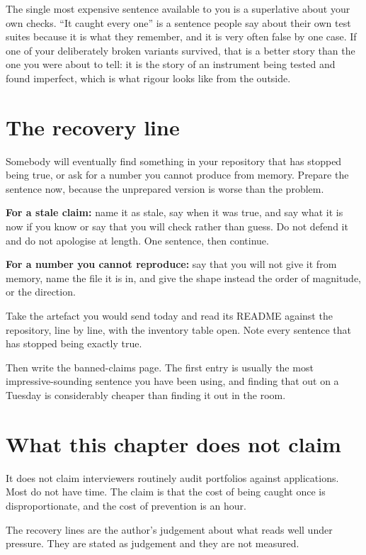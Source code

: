 \begin{kittrap}
The single most expensive sentence available to you is a superlative about your
own checks. ``It caught every one'' is a sentence people say about their own
test suites because it is what they remember, and it is very often false by one
case. If one of your deliberately broken variants survived, that is a better
story than the one you were about to tell: it is the story of an instrument
being tested and found imperfect, which is what rigour looks like from the
outside.
\end{kittrap}

\section{The recovery line}

Somebody will eventually find something in your repository that has stopped
being true, or ask for a number you cannot produce from memory. Prepare the
sentence now, because the unprepared version is worse than the problem.

\begin{kitmethod}
\textbf{For a stale claim:} name it as stale, say when it was true, and say what
it is now if you know \dash{} or say that you will check rather than guess. Do
not defend it and do not apologise at length. One sentence, then continue.

\textbf{For a number you cannot reproduce:} say that you will not give it from
memory, name the file it is in, and give the shape instead \dash{} the order of
magnitude, or the direction. 
\end{kitmethod}

\begin{drill}
Take the artefact you would send today and read its README against the
repository, line by line, with the inventory table open. Note every sentence
that has stopped being exactly true.

Then write the banned-claims page. The first entry is usually the most
impressive-sounding sentence you have been using, and finding that out on a
Tuesday is considerably cheaper than finding it out in the room.
\end{drill}

\section*{What this chapter does not claim}

It does not claim interviewers routinely audit portfolios against applications.
Most do not have time. The claim is that the cost of being caught once is
disproportionate, and the cost of prevention is an hour.

The recovery lines are the author's judgement about what reads well under
pressure. They are stated as judgement and they are not measured.
